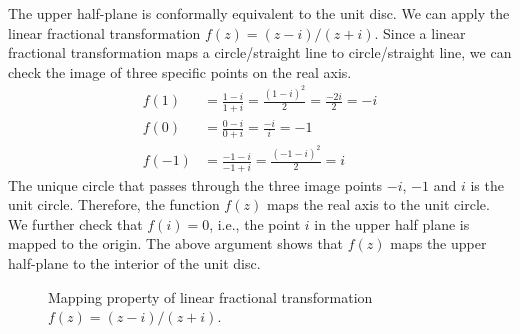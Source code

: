\begin{example} \label{ex:LFT_conformal}
The upper half-plane is conformally equivalent to the unit disc. We can apply the linear fractional transformation  $f(z) = (z-i)/(z+i)$. Since a linear fractional transformation maps a circle/straight line to circle/straight line, we can check the image of three specific points on the real axis.
	\begin{align*}
		f(1) &= \frac{1-i}{1+i} = \frac{(1-i)^2}{2} = \frac{-2i}{2} = -i \\
		f(0) &= \frac{0-i}{0+i} = \frac{-i}{i} = -1\\
		f(-1) &= \frac{-1-i}{-1+i} = \frac{(-1-i)^2}{2} = i
	\end{align*}
	The unique circle that passes through the three image points $-i$, $-1$ and $i$ is the unit circle. Therefore, the function $f(z)$ maps the real axis to the unit circle. We further check that $f(i)=0$, i.e., the point $i$ in the upper half plane is mapped to the origin. The above argument shows that $f(z)$ maps the upper half-plane to the interior of the unit disc.
\end{example}

\begin{figure}
	\begin{center}
	\end{center}
	\caption{Mapping property of linear fractional transformation $f(z) = (z-i)/(z+i)$.}
\label{fig:exp_map1}	
\end{figure}




